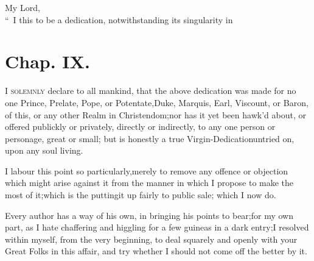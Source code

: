 \documentclass{article}
\begin{document}
My Lord,\\[-24pt]
\lettrine{\lower-12pt\hbox{\normalsize “ }I}{ } this to
be a dedication,\break
notwithstanding its singularity in\break
{}\pb
{}

\noindent{}

\newpage
\section{Chap. IX.}

\lettrine{I}{ solemnly} declare to all mankind,
that the above dedication was made for no one Prince, Prelate,
Pope, or Potentate,\tsk  Duke, Marquis, Earl, Viscount, or Baron, of this, or any other Realm in
Christendom;\tsh  nor has it yet been hawk’d about, or
offered publickly or privately, directly or indirectly, to any one
person or personage, great or small; but is honestly a true
Virgin-Dedication\break untried on, upon any soul living.

I labour this point so particularly,\break merely to remove any
offence or objection which might arise against it from the manner
in which I propose to make the most of it;\tsk  which is the
putting\pb it up fairly to public sale; which I now do.

\tsh  Every author has a way of his
own, in bringing his points to bear;\tsk  for
my own part, as I hate chaffering and
higgling for a few guineas in a dark\break
entry;\tsk  I resolved within myself, from
the very beginning, to deal squarely and 
openly with your Great Folks in this affair, 
and try whether I should not come
off the better by it.
\end{document}
